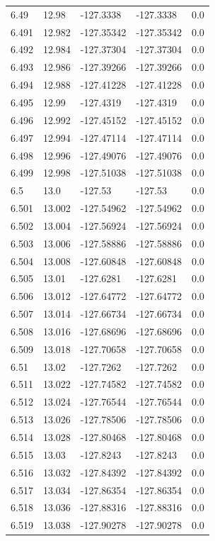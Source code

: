 \begin{tabular}{lllll}
6.49 & 12.98 & -127.3338 & -127.3338 & 0.0 \\
6.491 & 12.982 & -127.35342 & -127.35342 & 0.0 \\
6.492 & 12.984 & -127.37304 & -127.37304 & 0.0 \\
6.493 & 12.986 & -127.39266 & -127.39266 & 0.0 \\
6.494 & 12.988 & -127.41228 & -127.41228 & 0.0 \\
6.495 & 12.99 & -127.4319 & -127.4319 & 0.0 \\
6.496 & 12.992 & -127.45152 & -127.45152 & 0.0 \\
6.497 & 12.994 & -127.47114 & -127.47114 & 0.0 \\
6.498 & 12.996 & -127.49076 & -127.49076 & 0.0 \\
6.499 & 12.998 & -127.51038 & -127.51038 & 0.0 \\
6.5 & 13.0 & -127.53 & -127.53 & 0.0 \\
6.501 & 13.002 & -127.54962 & -127.54962 & 0.0 \\
6.502 & 13.004 & -127.56924 & -127.56924 & 0.0 \\
6.503 & 13.006 & -127.58886 & -127.58886 & 0.0 \\
6.504 & 13.008 & -127.60848 & -127.60848 & 0.0 \\
6.505 & 13.01 & -127.6281 & -127.6281 & 0.0 \\
6.506 & 13.012 & -127.64772 & -127.64772 & 0.0 \\
6.507 & 13.014 & -127.66734 & -127.66734 & 0.0 \\
6.508 & 13.016 & -127.68696 & -127.68696 & 0.0 \\
6.509 & 13.018 & -127.70658 & -127.70658 & 0.0 \\
6.51 & 13.02 & -127.7262 & -127.7262 & 0.0 \\
6.511 & 13.022 & -127.74582 & -127.74582 & 0.0 \\
6.512 & 13.024 & -127.76544 & -127.76544 & 0.0 \\
6.513 & 13.026 & -127.78506 & -127.78506 & 0.0 \\
6.514 & 13.028 & -127.80468 & -127.80468 & 0.0 \\
6.515 & 13.03 & -127.8243 & -127.8243 & 0.0 \\
6.516 & 13.032 & -127.84392 & -127.84392 & 0.0 \\
6.517 & 13.034 & -127.86354 & -127.86354 & 0.0 \\
6.518 & 13.036 & -127.88316 & -127.88316 & 0.0 \\
6.519 & 13.038 & -127.90278 & -127.90278 & 0.0 \\

\end{tabular}
